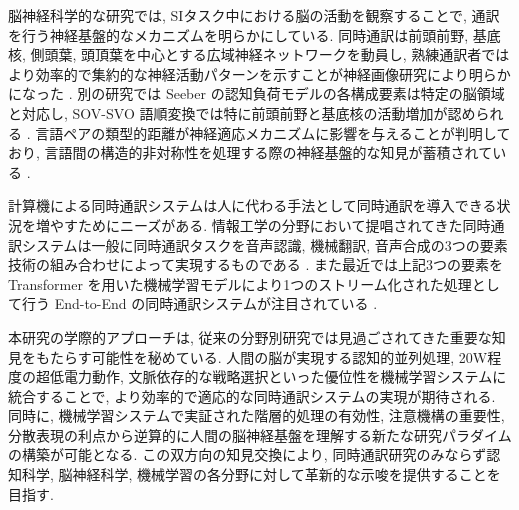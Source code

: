 脳神経科学的な研究では, SIタスク中における脳の活動を観察することで, 通訳を行う神経基盤的なメカニズムを明らかにしている.
同時通訳は前頭前野, 基底核, 側頭葉, 頭頂葉を中心とする広域神経ネットワークを動員し, 熟練通訳者ではより効率的で集約的な神経活動パターンを示すことが神経画像研究により明らかになった \cite{hervais2015fmri, vandeputte2018anatomical} .
別の研究では Seeber の認知負荷モデルの各構成要素は特定の脳領域と対応し, SOV-SVO 語順変換では特に前頭前野と基底核の活動増加が認められる \cite{yagura2021selective} .
言語ペアの類型的距離が神経適応メカニズムに影響を与えることが判明しており, 言語間の構造的非対称性を処理する際の神経基盤的な知見が蓄積されている \cite{lin2018costly, ishizuka2024two} .

計算機による同時通訳システムは人に代わる手法として同時通訳を導入できる状況を増やすためにニーズがある.
情報工学の分野において提唱されてきた同時通訳システムは一般に同時通訳タスクを音声認識, 機械翻訳, 音声合成の3つの要素技術の組み合わせによって実現するものである \cite{doi2024evaluation} .
また最近では上記3つの要素を Transformer \cite{vaswani2017attention} を用いた機械学習モデルにより1つのストリーム化された処理として行う End-to-End の同時通訳システムが注目されている \cite{liu2024recent, ma2024nast, zhang2024streamspeech} .

本研究の学際的アプローチは, 従来の分野別研究では見過ごされてきた重要な知見をもたらす可能性を秘めている.
人間の脳が実現する認知的並列処理, 20W程度の超低電力動作, 文脈依存的な戦略選択といった優位性を機械学習システムに統合することで, より効率的で適応的な同時通訳システムの実現が期待される.
同時に, 機械学習システムで実証された階層的処理の有効性, 注意機構の重要性, 分散表現の利点から逆算的に人間の脳神経基盤を理解する新たな研究パラダイムの構築が可能となる.
この双方向の知見交換により, 同時通訳研究のみならず認知科学, 脳神経科学, 機械学習の各分野に対して革新的な示唆を提供することを目指す.